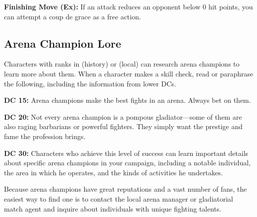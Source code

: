 \textbf{Finishing Move (Ex):} If an attack reduces an opponent below 0 hit points, you can attempt a coup de grace as a free action.

\subsection{Arena Champion Lore}
Characters with ranks in  (history) or  (local) can research arena champions to learn more about them. When a character makes a skill check, read or paraphrase the following, including the information from lower DCs.

\textbf{DC 15:} Arena champions make the best fights in an arena. Always bet on them.

\textbf{DC 20:} Not every arena champion is a pompous gladiator---some of them are also raging barbarians or powerful fighters. They simply want the prestige and fame the profession brings.

\textbf{DC 30:} Characters who achieve this level of success can learn important details about specific arena champions in your campaign, including a notable individual, the area in which he operates, and the kinds of activities he undertakes.

Because arena champions have great reputations and a vast number of fans, the easiest way to find one is to contact the local arena manager or gladiatorial match agent and inquire about individuals with unique fighting talents.